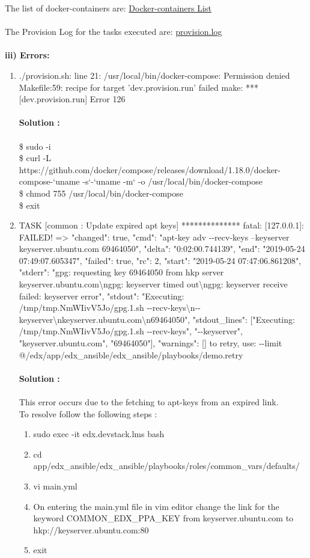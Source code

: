 \documentclass[12pt]{article}
\begin{document}
The list of docker-containers are: \href{https://drive.google.com/open?id=0B168SrnPp4BpZ1RCQ1VncU81VEZYanl2SUNWN2dtRUg1bGRv}{Docker-containers List}
\\\\
The Provision Log for the tasks executed are: \href{https://drive.google.com/open?id=0B168SrnPp4BpclQ3d3gwbDNWLWtrUzduYUt6Vko4S2h6bzBz}{provision.log}\\\\
\textbf{iii) Errors:}
\begin{enumerate}
	\item  ./provision.sh: line 21: /usr/local/bin/docker-compose: Permission denied
	Makefile:59: recipe for target 'dev.provision.run' failed
	make: *** [dev.provision.run] Error 126\\\\
	\textbf{Solution :}\\\\
	\$ sudo -i\\
	\$ curl -L https://github.com/docker/compose/releases/download/1.18.0/docker-compose-`uname -s`-`uname -m` -o /usr/local/bin/docker-compose\\
	\$ chmod 755 /usr/local/bin/docker-compose\\
	\$ exit
	\item TASK [common : Update expired apt keys] **************
	fatal: [127.0.0.1]: FAILED! => {"changed": true, "cmd": "apt-key adv -{}-recv-keys --keyserver keyserver.ubuntu.com 69464050", "delta": "0:02:00.744139", "end": "2019-05-24 07:49:07.605347", "failed": true, "rc": 2, "start": "2019-05-24 07:47:06.861208", "stderr": "gpg: requesting key 69464050 from hkp server keyserver.ubuntu.com\textbackslash ngpg: keyserver timed out\textbackslash ngpg: keyserver receive failed: keyserver error", "stdout": "Executing: /tmp/tmp.NmWIivV5Jo/gpg.1.sh -{}-recv-keys\textbackslash n-{}-keyserver\textbackslash nkeyserver.ubuntu.com\textbackslash n69464050", "stdout\_lines": ["Executing: /tmp/tmp.NmWIivV5Jo/gpg.1.sh -{}-recv-keys", "-{}-keyserver", "keyserver.ubuntu.com", "69464050"], "warnings": []}
	to retry, use: -{}-limit @/edx/app/edx\_ansible/edx\_ansible/playbooks/demo.retry\\\\
	\textbf{Solution :}\\\\
	This error occurs due to the fetching to apt-keys from an expired link.\\
	To resolve follow the following steps :
	\begin{enumerate}
		\item sudo exec -it edx.devstack.lms bash
		\item cd app/edx\_ansible/edx\_ansible/playbooks/roles/common\_vars/defaults/
		\item vi main.yml
		\item On entering the main.yml file in vim editor change the link for the keyword 
		COMMON\_EDX\_PPA\_KEY from keyserver.ubuntu.com to  hkp://keyserver.ubuntu.com:80
		\item exit
	\end{enumerate}
\end{enumerate}
\end{document}
